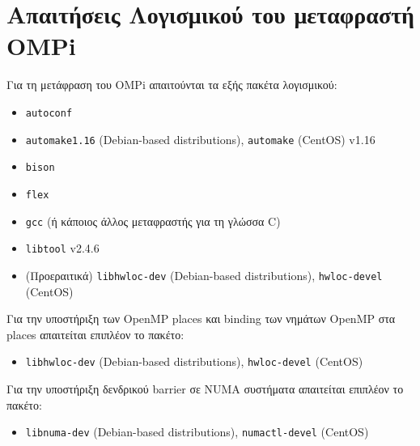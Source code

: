 \chapter{Απαιτήσεις Λογισμικού του μεταφραστή OMPi}
\label{app:FirstAppendix}

Για τη μετάφραση του OMPi απαιτούνται τα εξής πακέτα λογισμικού:

\begin{itemize}
	\item \texttt{autoconf}
	\item \texttt{automake1.16} (Debian-based distributions), \texttt{automake} (CentOS) v1.16
	\item \texttt{bison}
	\item \texttt{flex}
	\item \texttt{gcc} (ή κάποιος άλλος μεταφραστής για τη γλώσσα C)
	\item \texttt{libtool} v2.4.6
	\item (Προεραιτικά) \texttt{libhwloc-dev} (Debian-based distributions), \texttt{hwloc-devel} (CentOS)
\end{itemize}

\noindent  Για την υποστήριξη των OpenMP places και binding των νημάτων OpenMP στα places απαιτείται επιπλέον το πακέτο:

\begin{itemize}
	\item \texttt{libhwloc-dev} (Debian-based distributions), \texttt{hwloc-devel} (CentOS)
\end{itemize}

\noindent Για την υποστήριξη δενδρικού barrier σε NUMA συστήματα απαιτείται επιπλέον το πακέτο:

\begin{itemize}
	\item \texttt{libnuma-dev} (Debian-based distributions), \texttt{numactl-devel} (CentOS)
\end{itemize}